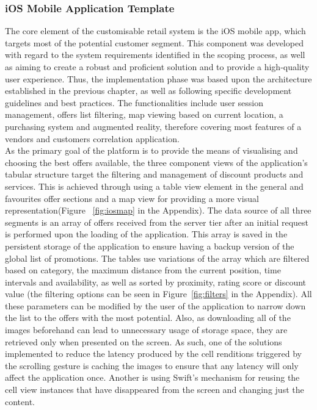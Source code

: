 \subsubsection{iOS Mobile Application Template}

The core element of the customisable retail system is the iOS mobile app, which targets most of the potential customer segment. This component was developed with regard to the system requirements identified in the scoping process, as well as aiming to create a robust and proficient solution and to provide a high-quality user experience. Thus, the implementation phase was based upon the architecture established in the previous chapter, as well as following specific development guidelines and best practices. The functionalities include user session management, offers list filtering, map viewing based on current location, a purchasing system and augmented reality, therefore covering most features of a vendors and customers correlation application.\\

As the primary goal of the platform is to provide the means of visualising and choosing the best offers available, the three component views of the application's tabular structure target the filtering and management of discount products and services. This is achieved through using a table view element in the general and favourites offer sections and a map view for providing a more visual representation(Figure ~\ref{fig:iosmap} in the Appendix). The data source of all three segments is an array of offers received from the server tier after an initial request is performed upon the loading of the application. This array is saved in the persistent storage of the application to ensure having a backup version of the global list of promotions. The tables use variations of the array which are filtered based on category, the maximum distance from the current position, time intervals and availability, as well as sorted by proximity, rating score or discount value (the filtering options can be seen in Figure~\ref{fig:filters} in the Appendix). All these parameters can be modified by the user of the application to narrow down the list to the offers with the most potential. Also, as downloading all of the images beforehand can lead to unnecessary usage of storage space, they are retrieved only when presented on the screen. As such, one of the solutions implemented to reduce the latency produced by the cell renditions triggered by the scrolling gesture is caching the images to ensure that any latency will only affect the application once.  Another is using Swift's mechanism for reusing the cell view instances that have disappeared from the screen and changing just the content.  \\

